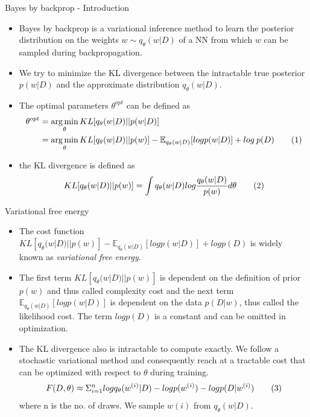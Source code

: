 \documentclass{beamer}
\theoremstyle{remark}
\newcommand\numberthis{\addtocounter{equation}{1}\tag{\theequation}}
\DeclareMathOperator*{\argmin}{arg\,min}
\begin{document}
\begin{frame}{Bayes by backprop - Introduction}
    \begin{itemize}
        \item Bayes by backprop is a variational inference method to learn the posterior distribution on the weights $w \sim q_\theta (w|D)$ of a NN from which $w$ can be sampled during backpropagation.
        \item We try to minimize the KL divergence between the intractable true posterior $p(w|D)$ and the approximate distribution $q_\theta(w|D)$.
        \item The optimal parameters $\theta^{opt}$ can be defined as
        \begin{align*}
            \theta^{opt} &= \argmin_\theta KL [q_\theta(w|D) || p(w|D)]\\
            &= \argmin_\theta KL [q_\theta(w|D) || p(w)] - \mathbb{E}_{q_\theta(w|D)} [log p(w|D)]+log\:p(D) \numberthis{\label{eq1}}\\ 
        \end{align*}
        \item the KL divergence is defined as 
        \begin{align*}
            KL[q_\theta(w|D)||p(w)] = \int q_\theta(w|D) log \frac{q_\theta(w|D)}{p(w)} d\theta \numberthis{\label{eq2}}
        \end{align*}
    \end{itemize}
\end{frame}
\begin{frame}{Variational free energy}
    \begin{itemize}
        \item The cost function $ KL [q_\theta(w|D) || p(w)] - \mathbb{E}_{q_\theta(w|D)} [log p(w|D)]+logp(D)$ is widely known as \emph{variational free energy}.
        \item The first term $ KL [q_\theta(w|D) || p(w)]$ is dependent on the definition of prior $p(w)$ and thus called complexity cost and the next term $\mathbb{E}_{q_\theta(w|D)} [log p(w|D)]$ is dependent on the data $p(D|w)$, thus called the likelihood cost. The term $log p(D)$ is a constant and can be omitted in optimization.
        \item The KL divergence also is intractable to compute exactly. We follow a stochastic variational method and consequently reach at a tractable cost that can be optimized with respect to $\theta$ during training.
        \begin{align*}
            F(D,\theta) \approx \Sigma_{i=1}^{n} log q_\theta (w^{(i)}|D) - log p(w^{(i)}) - log p(D|w^{(i)}) \numberthis{\label{eq3}} \\
        \end{align*}
        where n is the no. of draws. We sample $w(i)$ from $q_\theta(w|D)$.
    \end{itemize}
\end{frame}
\end{document}
